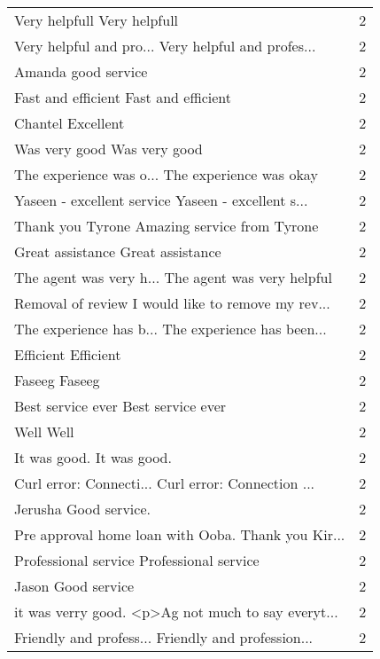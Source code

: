 \begin{tabular}{lr}
Very helpfull Very helpfull                        &        2 \\
Very helpful and pro... Very helpful and profes... &        2 \\
Amanda good service                                &        2 \\
Fast and efficient Fast and efficient              &        2 \\
Chantel Excellent                                  &        2 \\
Was very good Was very good                        &        2 \\
The experience was o... The experience was okay    &        2 \\
Yaseen - excellent service Yaseen - excellent s... &        2 \\
Thank you Tyrone Amazing service from Tyrone       &        2 \\
Great assistance Great assistance                  &        2 \\
The agent was very h... The agent was very helpful &        2 \\
Removal of review I would like to remove my rev... &        2 \\
The experience has b... The experience has been... &        2 \\
Efficient Efficient                                &        2 \\
Faseeg Faseeg                                      &        2 \\
Best service ever Best service ever                &        2 \\
Well Well                                          &        2 \\
It was good. It was good.                          &        2 \\
Curl error: Connecti... Curl error: Connection ... &        2 \\
Jerusha Good service.                              &        2 \\
Pre approval home loan with Ooba. Thank you Kir... &        2 \\
Professional service Professional service          &        2 \\
Jason  Good service                                &        2 \\
it was verry good. <p>Ag not much to say everyt... &        2 \\
Friendly and profess... Friendly and profession... &        2 \\

\end{tabular}
